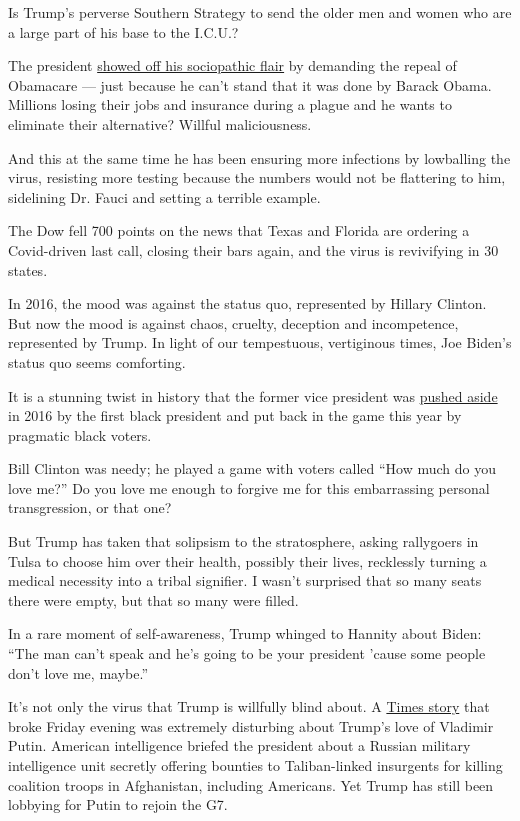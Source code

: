 Is Trump's perverse Southern Strategy to send the older men and women
who are a large part of his base to the I.C.U.?

The president
\href{https://www.nytimes.com/2020/06/26/us/politics/obamacare-trump-administration-supreme-court.html}{showed
off his sociopathic flair} by demanding the repeal of Obamacare --- just
because he can't stand that it was done by Barack Obama. Millions losing
their jobs and insurance during a plague and he wants to eliminate their
alternative? Willful maliciousness.

And this at the same time he has been ensuring more infections by
lowballing the virus, resisting more testing because the numbers would
not be flattering to him, sidelining Dr. Fauci and setting a terrible
example.

The Dow fell 700 points on the news that Texas and Florida are ordering
a Covid-driven last call, closing their bars again, and the virus is
revivifying in 30 states.

In 2016, the mood was against the status quo, represented by Hillary
Clinton. But now the mood is against chaos, cruelty, deception and
incompetence, represented by Trump. In light of our tempestuous,
vertiginous times, Joe Biden's status quo seems comforting.

It is a stunning twist in history that the former vice president was
\href{https://www.nytimes.com/2019/08/16/us/politics/biden-obama-history.html}{pushed
aside} in 2016 by the first black president and put back in the game
this year by pragmatic black voters.

Bill Clinton was needy; he played a game with voters called ``How much
do you love me?'' Do you love me enough to forgive me for this
embarrassing personal transgression, or that one?

But Trump has taken that solipsism to the stratosphere, asking
rallygoers in Tulsa to choose him over their health, possibly their
lives, recklessly turning a medical necessity into a tribal signifier. I
wasn't surprised that so many seats there were empty, but that so many
were filled.

In a rare moment of self-awareness, Trump whinged to Hannity about
Biden: ``The man can't speak and he's going to be your president 'cause
some people don't love me, maybe.''

It's not only the virus that Trump is willfully blind about. A
\href{https://www.nytimes.com/2020/06/26/us/politics/russia-afghanistan-bounties.html}{Times
story} that broke Friday evening was extremely disturbing about Trump's
love of Vladimir Putin. American intelligence briefed the president
about a Russian military intelligence unit secretly offering bounties to
Taliban-linked insurgents for killing coalition troops in Afghanistan,
including Americans. Yet Trump has still been lobbying for Putin to
rejoin the G7.

